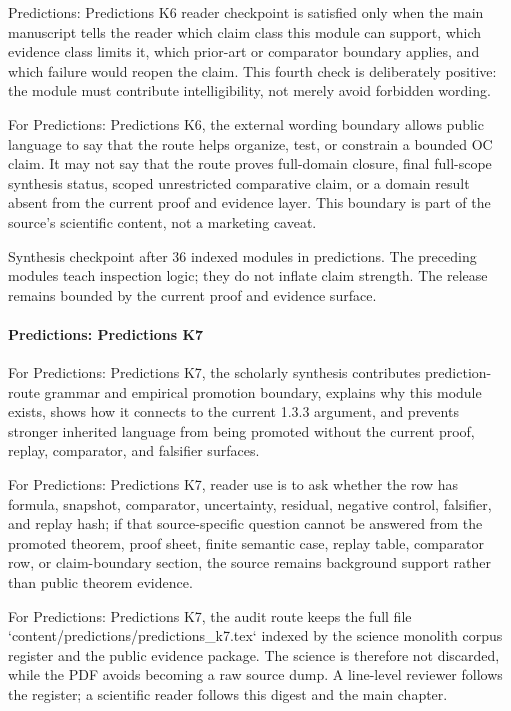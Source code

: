 Predictions: Predictions K6 reader checkpoint is satisfied only when the main manuscript tells the reader which claim class this module can support, which evidence class limits it, which prior-art or comparator boundary applies, and which failure would reopen the claim. This fourth check is deliberately positive: the module must contribute intelligibility, not merely avoid forbidden wording.


For Predictions: Predictions K6, the external wording boundary allows public language to say that the route helps organize, test, or constrain a bounded OC claim. It may not say that the route proves full-domain closure, final full-scope synthesis status, scoped unrestricted comparative claim, or a domain result absent from the current proof and evidence layer. This boundary is part of the source's scientific content, not a marketing caveat.


Synthesis checkpoint after 36 indexed modules in predictions. The preceding modules teach inspection logic; they do not inflate claim strength. The release remains bounded by the current proof and evidence surface.


\paragraph{Predictions: Predictions K7}

For Predictions: Predictions K7, the scholarly synthesis contributes prediction-route grammar and empirical promotion boundary, explains why this module exists, shows how it connects to the current 1.3.3 argument, and prevents stronger inherited language from being promoted without the current proof, replay, comparator, and falsifier surfaces.


For Predictions: Predictions K7, reader use is to ask whether the row has formula, snapshot, comparator, uncertainty, residual, negative control, falsifier, and replay hash; if that source-specific question cannot be answered from the promoted theorem, proof sheet, finite semantic case, replay table, comparator row, or claim-boundary section, the source remains background support rather than public theorem evidence.


For Predictions: Predictions K7, the audit route keeps the full file `content/predictions/predictions\_k7.tex` indexed by the science monolith corpus register and the public evidence package. The science is therefore not discarded, while the PDF avoids becoming a raw source dump. A line-level reviewer follows the register; a scientific reader follows this digest and the main chapter.


